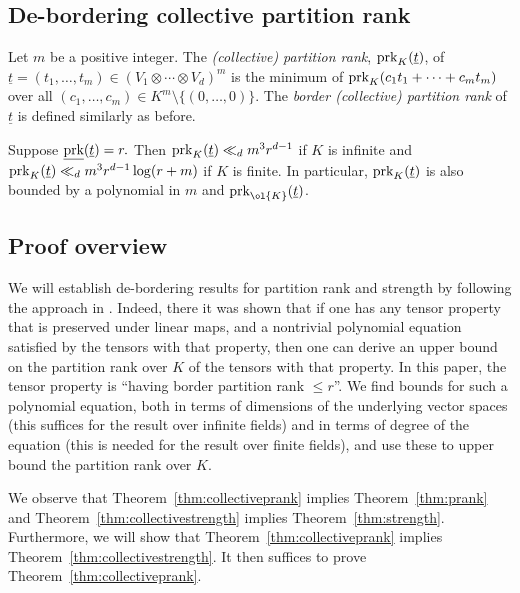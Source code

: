 \documentclass{amsart}
\newcommand{\prk}{\textnormal{prk}}
\newcommand{\ul}[1]{\underline{#1}}
\begin{document}
\subsection{De-bordering collective partition rank}

\begin{de}
Let $m$ be a positive integer. The {\em (collective) partition rank}, $\prk_K(\ul{t})$,
of $\ul{t}=(t_1,\ldots,t_m) \in (V_1 \otimes \cdots \otimes V_d)^m$ is the
minimum of \linebreak $\prk_K(c_1 t_1 + \cdots + c_m t_m)$ over all $(c_1,\ldots,c_m)
\in K^m \setminus \{(0,\ldots,0)\}$. The {\em border (collective)
partition rank} of $\ul{t}$ is defined similarly as before. 
\end{de}


\begin{thm} \label{thm:collectiveprank}
Suppose $\ul{\prk}(\ul{t}) = r.$ Then $\prk_K(\ul{t}) \ll_d m^3r^{d-1}$ if $K$ is infinite and 
 $\prk_K(\ul{t}) \ll_d m^3r^{d-1} \log(r+m)$ if $K$ is finite. In particular, $\prk_K(\ul{t})$ is also bounded by a polynomial in $m$ and $ \prk_{\ol{K}}(\ul{t})$.
\end{thm}

\subsection{Proof overview}

We will establish de-bordering results for partition rank
and strength by following the approach in \cite{Draisma18b}. Indeed,
there it was shown that if one has any tensor property that is preserved
under linear maps, and a nontrivial polynomial equation satisfied by the
tensors with that property, then one can derive an upper bound on the
partition rank over $K$ of the tensors with that property. In this paper,
the tensor property is ``having border partition rank $\leq r$''. We find
bounds for such a polynomial equation, both in terms of dimensions of
the underlying vector spaces (this suffices for the result over infinite
fields) and in terms of degree of the equation (this is needed for the
result over finite fields), and use these to upper bound the partition
rank over $K$.

We observe that Theorem~\ref{thm:collectiveprank} implies
Theorem~\ref{thm:prank} and Theorem~\ref{thm:collectivestrength}
implies Theorem~\ref{thm:strength}. Furthermore, we
will show that Theorem~\ref{thm:collectiveprank} implies
Theorem~\ref{thm:collectivestrength}. It then suffices to prove
Theorem~\ref{thm:collectiveprank}.
\end{document}
